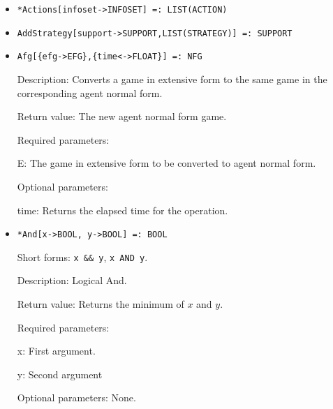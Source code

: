\begin{itemize}


\item
\protect \large \begin{verbatim} 
*Actions[infoset->INFOSET] =: LIST(ACTION)
\end{verbatim}\normalsize

\item
\protect \large \begin{verbatim}
AddStrategy[support->SUPPORT,LIST(STRATEGY)] =: SUPPORT
\end{verbatim}\normalsize

\item
\protect \large \begin{verbatim}
Afg[{efg->EFG},{time<->FLOAT}] =: NFG
\end{verbatim}\normalsize

\bd
\item
[Description:] Converts a game in extensive form to the same
game in the corresponding agent normal form.
\item
[Return value:] The new agent normal form game.
\item 
[Required parameters:]\hfil\null

\bd
\item
[E:] The game in extensive form to be converted to agent normal
form.
\ed

\item
[Optional parameters:]\hfil\null
	
\bd
\item
[time:] Returns the elapsed time for the operation.
\ed
\ed

\item 
\protect \large \begin{verbatim}
*And[x->BOOL, y->BOOL] =: BOOL
\end{verbatim} \normalsize
\bd
\item
[Short forms:] \verb+x && y+, \verb+x AND y+.
\item
[Description:] Logical And.
\item
[Return value:] Returns the minimum of $x$ and $y$.  
\item
[Required parameters:]\hfil\null
\bd
\item
[x:] First argument.  
\item
[y:] Second argument
\ed
\item
[Optional parameters:] None.
\ed



\end{itemize}
